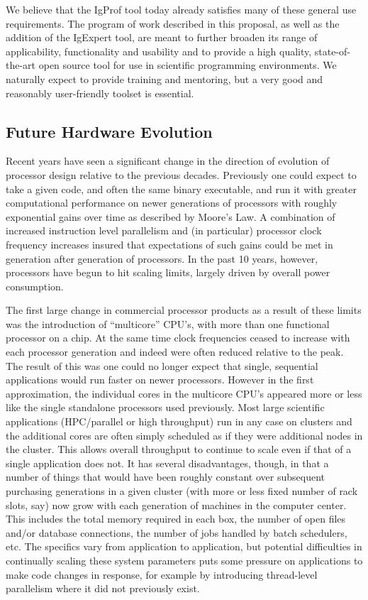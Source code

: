 \documentclass[notitlepage,letter,12pt]{article}
\begin{document}
We believe that the IgProf tool today already satisfies many of these
general use requirements. The program of work described in this
proposal, as well as the addition of the IgExpert tool, are meant
to further broaden its range of applicability, functionality and 
usability and to provide a high quality, state-of-the-art open source
tool for use in scientific programming environments. We naturally expect
to provide training and mentoring, but a very good and reasonably
user-friendly toolset is essential.  

\subsection{Future Hardware Evolution}

Recent years have seen a significant change in the direction of
evolution of processor design relative to the previous decades.
Previously one could expect to take a given code, and often the
same binary executable, and run it with greater computational
performance on newer generations of processors with roughly exponential
gains over time as described by Moore's Law.  A combination of increased
instruction level parallelism and (in particular) processor clock frequency 
increases insured that expectations of such gains could be met in generation 
after generation of processors. In the past 10 years, however, 
processors have begun to hit scaling limits, largely driven by overall 
power consumption.

The first large change in commercial processor products as a
result of these limits was the introduction of ``multicore'' CPU's,
with more than one functional processor on a chip. At the same time
clock frequencies ceased to increase with each processor generation and 
indeed were often reduced relative to the peak. The result of this was
one could no longer expect that single, sequential applications would
run faster on newer processors. However in the first approximation,
the individual cores in the multicore CPU's appeared more or less
like the single standalone processors used previously. Most large
scientific applications (HPC/parallel or high throughput) run in
any case on clusters and the additional cores are often simply
scheduled as if they were additional nodes in the cluster. This
allows overall throughput to continue to scale even if that of a
single application does not. It has several disadvantages, though,
in that a number of things that would have been roughly constant
over subsequent purchasing generations in a given cluster (with
more or less fixed number of rack slots, say) now grow with each
generation of machines in the computer center. This includes the
total memory required in each box, the number of open files and/or
database connections, the number of jobs handled by batch schedulers,
etc.  The specifics vary from application to application, but
potential difficulties in continually scaling these system parameters
puts some pressure on applications to make code changes in response,
for example by introducing thread-level parallelism where it did
not previously exist.
\end{document}
